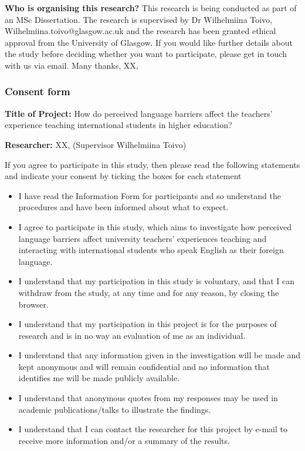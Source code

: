\documentclass[
  english,
  letterpaper,
  DIV=11,
  numbers=noendperiod]{scrreprt}
\providecommand{\tightlist}{%
  \setlength{\itemsep}{0pt}\setlength{\parskip}{0pt}}
\begin{document}
\textbf{Who is organising this research?} This research is being
conducted as part of an MSc Dissertation. The research is supervised by
Dr Wilhelmiina Toivo, Wilhelmiina.toivo@glasgow.ac.uk and the research
has been granted ethical approval from the University of Glasgow. If you
would like further details about the study before deciding whether you
want to participate, please get in touch with us via email. Many thanks,
XX,

\subsubsection{Consent form}\label{consent-form}

\textbf{Title of Project:} How do perceived language barriers affect the
teachers' experience teaching international students in higher
education?

\textbf{Researcher:} XX, (Supervisor Wilhelmiina Toivo)

If you agree to participate in this study, then please read the
following statements and indicate your consent by ticking the boxes for
each statement

\begin{itemize}
\tightlist
\item
  I have read the Information Form for participants and so understand
  the procedures and have been informed about what to expect.
\item
  I agree to participate in this study, which aims to investigate how
  perceived language barriers affect university teachers' experiences
  teaching and interacting with international students who speak English
  as their foreign language.
\item
  I understand that my participation in this study is voluntary, and
  that I can withdraw from the study, at any time and for any reason, by
  closing the browser.
\item
  I understand that my participation in this project is for the purposes
  of research and is in no way an evaluation of me as an individual.
\item
  I understand that any information given in the investigation will be
  made and kept anonymous and will remain confidential and no
  information that identifies me will be made publicly available.
\item
  I understand that anonymous quotes from my responses may be used in
  academic publications/talks to illustrate the findings.
\item
  I understand that I can contact the researcher for this project by
  e-mail to receive more information and/or a summary of the results.
\end{itemize}
\end{document}
